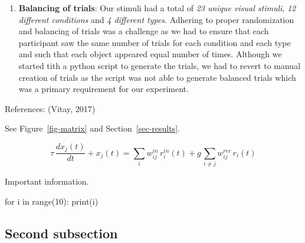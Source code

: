 \documentclass[
  a4paper,
]{article}
\newenvironment{Shaded}{}{}
\newcommand{\BuiltInTok}[1]{\textcolor[rgb]{0.84,0.23,0.29}{#1}}
\newcommand{\ControlFlowTok}[1]{\textcolor[rgb]{0.84,0.23,0.29}{#1}}
\newcommand{\DecValTok}[1]{\textcolor[rgb]{0.00,0.36,0.77}{#1}}
\newcommand{\KeywordTok}[1]{\textcolor[rgb]{0.84,0.23,0.29}{#1}}
\newcommand{\NormalTok}[1]{\textcolor[rgb]{0.14,0.16,0.18}{#1}}
\providecommand{\tightlist}{%
  \setlength{\itemsep}{0pt}\setlength{\parskip}{0pt}}\usepackage{longtable,booktabs,array}
\begin{document}
\begin{enumerate}
\def\labelenumi{\arabic{enumi}.}
\tightlist
\item
  \textbf{Balancing of trials}: Our stimuli had a total of \emph{23
  unique visual stimuli}, \emph{12 different conditions} and \emph{4
  different types}. Adhering to proper randomization and balancing of
  trials was a challenge as we had to ensure that each participant saw
  the same number of trials for each condition and each type and such
  that each object appeared equal number of times. Although we started
  tith a python script to generate the trials, we had to revert to
  manual creation of trials as the script was not able to generate
  balanced trials which was a primary requirement for our experiment.
\end{enumerate}

References: (Vitay, 2017)

See Figure~\ref{fig-matrix} and Section~\ref{sec-results}.

\[
    \tau \, \frac{dx_j(t)}{dt} + x_j(t)= \sum_i w^{in}_{ij} \, r^{in}_i(t) + g \, \sum_{i \neq j} w^{rec}_{ij} \, r_i(t)
\]

\begin{tcolorbox}[enhanced jigsaw, colback=white, breakable, leftrule=.75mm, colbacktitle=quarto-callout-note-color!10!white, toptitle=1mm, colframe=quarto-callout-note-color-frame, arc=.35mm, opacityback=0, bottomrule=.15mm, title=\textcolor{quarto-callout-note-color}{\faInfo}\hspace{0.5em}{Nota Bene}, titlerule=0mm, opacitybacktitle=0.6, bottomtitle=1mm, rightrule=.15mm, toprule=.15mm, left=2mm, coltitle=black]

Important information.

\end{tcolorbox}

\begin{Shaded}
\begin{Highlighting}[]
\ControlFlowTok{for}\NormalTok{ i }\KeywordTok{in} \BuiltInTok{range}\NormalTok{(}\DecValTok{10}\NormalTok{):}
    \BuiltInTok{print}\NormalTok{(i)}
\end{Highlighting}
\end{Shaded}

\hypertarget{second-subsection}{%
\subsection{Second subsection}\label{second-subsection}}
\end{document}
